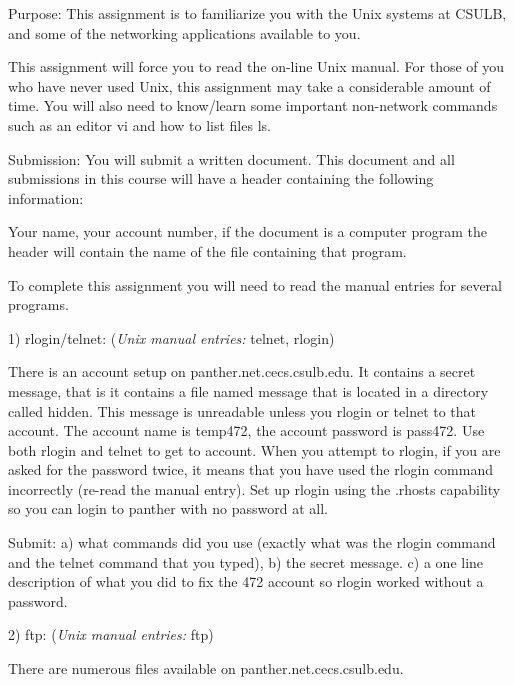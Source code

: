 

\parindent 0pt

Purpose: This assignment is to familiarize you with the Unix systems at
CSULB, and some of the networking applications available to you.

This assignment will force you to read the on-line Unix manual.
For those of you who have never used Unix, this assignment may take a
considerable amount of time.
You will also need to know/learn some important non-network commands such as 
an editor {\ltt{}vi} and how to list files {\ltt{}ls}.

Submission: You will submit a written document.
This document and all submissions in this course will have a header
containing the following information:

Your name, your account number, if the document is a computer program
the header will contain the name of the file containing that program.

To complete this assignment you will need to read the manual entries
for several programs.

1) rlogin/telnet: ({\it Unix manual entries:} {\ltt{}telnet}, {\ltt{}rlogin})

There is an account setup on panther.net.cecs.csulb.edu.
It contains a secret message, 
that is it contains a file named {\ltt{}message} that is located
in a directory called {\ltt{}hidden}. This message is
unreadable unless you rlogin or telnet to that account.
The account name is {\ltt{}temp472}, the account password is {\ltt{}pass472}.
Use both {\ltt{}rlogin} and {\ltt{}telnet} to get to account.
When you attempt to rlogin, if you are asked for the password twice, it means
that you have used the rlogin command incorrectly (re-read the manual entry).
Set up rlogin using the {\ltt{}.rhosts} capability so you can login to
{\ltt{}panther} with no password at all.

Submit: 
a) what commands did you use (exactly what was the {\ltt{}rlogin} command
and the {\ltt{}telnet} command that you typed),
b) the secret message.
c) a one line description of what you did to fix the 472 account so rlogin
worked without a password.

2) ftp: 
({\it Unix manual entries:} {\ltt{}ftp})

There are numerous files available on {\ltt{}panther.net.cecs.csulb.edu}.

